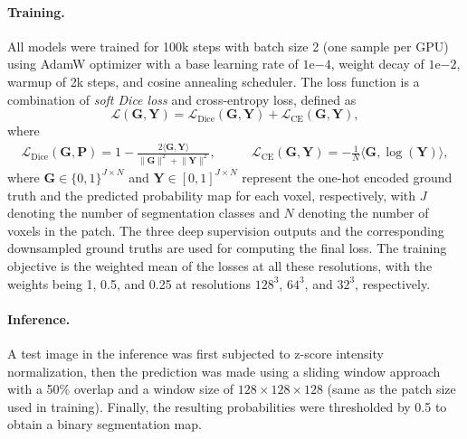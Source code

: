 \documentclass[a4,12pt]{article}
\begin{document}
	\paragraph{Training.} 
	All models were trained for 100k steps with batch size 2 (one sample per GPU) using AdamW optimizer with a base learning rate of $ 1\mathrm{e}{-4} $, weight decay of $ 1\mathrm{e}{-2} $, warmup of 2k steps, and cosine annealing scheduler. The loss function is a combination of \textit{soft Dice loss} \citep{milletari2016v} and cross-entropy loss, defined as
	\begin{equation}
		\label{eq: loss}
		\mathcal{L}(\mathbf{G}, \mathbf{Y}) = \mathcal{L}_{\text{Dice}}(\mathbf{G}, \mathbf{Y}) + \mathcal{L}_{\text{CE}}(\mathbf{G}, \mathbf{Y}),
	\end{equation}
	where
	\begin{align}
		\label{eq: dice and cross-entropy loss}
		\mathcal{L}_{\text{Dice}}(\mathbf{G}, \mathbf{P}) = 1 - \frac{2 \langle \mathbf{G}, \mathbf{Y} \rangle}{\lVert\mathbf{G}\rVert^2 + \lVert\mathbf{Y}\rVert^2}, \qquad & \mathcal{L}_{\text{CE}}(\mathbf{G}, \mathbf{Y}) =  -\frac{1}{N}\langle \mathbf{G}, \log(\mathbf{Y}) \rangle,
	\end{align}
	where $ \mathbf{G} \in \{0, 1\}^{J \times N} $ and $ \mathbf{Y} \in [0, 1]^{J \times N} $ represent the one-hot encoded ground truth and the predicted probability map for each voxel, respectively, with $ J $ denoting the number of segmentation classes and $ N $ denoting the number of voxels in the patch. The three deep supervision outputs and the corresponding downsampled ground truths are used for computing the final loss. The training objective is the weighted mean of the losses at all these resolutions, with the weights being 1, 0.5, and 0.25 at resolutions $ 128^3 $, $ 64^3 $, and $ 32^3 $, respectively.
	
	\paragraph{Inference.} 
	A test image in the inference was first subjected to z-score intensity normalization, then the prediction was made using a sliding window approach with a 50\% overlap and a window size of $ 128 \times 128 \times 128 $ (same as the patch size used in training). Finally, the resulting probabilities were thresholded by 0.5 to obtain a binary segmentation map.
	
\end{document}
